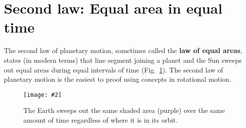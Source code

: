 \documentclass[11pt]{article}
\newcommand{\pic}[2]{
  \texttt{[image: \#2]}
}
\begin{document}
\section{Second law: Equal area in equal time}

The second law of planetary motion, sometimes called the \textbf{law of
  equal areas}, states (in modern terms) that line segment joining a planet and
the Sun sweeps out equal areas during equal intervals of time (Fig.~\ref{kep2}).
The second law of planetary motion is the easiest to proof using concepts in
rotational motion.
\begin{figure}[!ht]
  \centering
    \pic{.55}{../201532-132212364-3243-planet.png}
    \caption{The Earth sweeps out the same shaded area (purple) over the
      same amount of time regardless of where it is in its orbit.}
    \label{kep2}
\end{figure}
\end{document}
